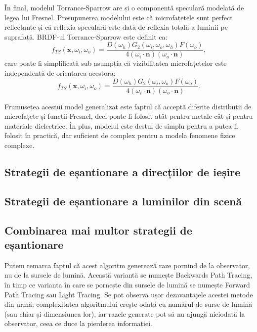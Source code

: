 \documentclass[12pt,a4paper]{report}
\numberwithin{equation}{section} %
\begin{document}
În final, modelul Torrance-Sparrow are și o componentă speculară modelată de legea
lui Fresnel. Presupunerea modelului este că microfațetele sunt perfect reflectante
și că reflexia speculară este dată de reflexia totală a luminii pe suprafață.
BRDF-ul Torrance-Sparrow este definit ca:
\begin{equation}
	f_{TS}(\mathbf{x}, \omega_i, \omega_o) = \frac{D(\omega_h)G_2(\omega_i, \omega_o, \omega_h)F(\omega_o)}{4(\omega_i \cdot \mathbf{n})(\omega_o \cdot \mathbf{n})},
\end{equation}
care poate fi simplificată sub asumpția că vizibilitatea microfațetelor este independentă
de orientarea acestora:
\begin{equation}
	f_{TS}(\mathbf{x}, \omega_i, \omega_o) = \frac{D(\omega_h)G_2(\omega_i, \omega_o)F(\omega_o)}{4(\omega_i \cdot \mathbf{n})(\omega_o \cdot \mathbf{n})}.
\end{equation}

Frumusețea acestui model generalizat este faptul că acceptă diferite distribuții
de microfațete și funcții Fresnel, deci poate fi folosit atât pentru metale cât
și pentru materiale dielectrice. În plus, modelul este destul de simplu pentru a
putea fi folosit în practică, dar suficient de complex pentru a modela fenomene
fizice complexe.

\subsection{Strategii de eșantionare a direcțiilor de ieșire}

\subsection{Strategii de eșantionare a luminilor din scenă}

\subsection{Combinarea mai multor strategii de eșantionare}



Putem remarca faptul că acest algoritm generează raze pornind de la observator, nu
de la sursele de lumină. Această variantă se numește Backwards Path Tracing, în
timp ce varianta în care se pornește din sursele de lumină se numește Forward Path Tracing
sau Light Tracing. Se pot observa ușor dezavantajele acestei metode din urmă:
complexitatea algoritmului crește odată cu numărul de surse de lumină (sau chiar și
dimensiunea lor), iar razele generate pot să nu ajungă niciodată la observator, ceea
ce duce la pierderea informației.
\end{document}
